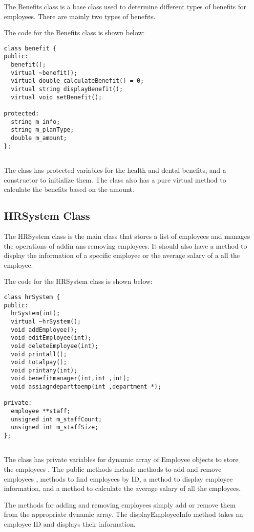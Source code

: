 \documentclass{article}
\begin{document}
The Benefits class is a base class used to determine different types of benefits for employees. There are mainly two types of benefits.

The code for the Benefits class is shown below:

\begin{verbatim}
class benefit {
public:
  benefit();
  virtual ~benefit();
  virtual double calculateBenefit() = 0;
  virtual string displayBenefit();
  virtual void setBenefit();

protected:
  string m_info;
  string m_planType;
  double m_amount;
};


\end{verbatim}

The class has protected variables for the health and dental benefits, and a constructor to initialize them. The class also has a pure virtual method to calculate the benefits based on the amount.

\subsection{HRSystem Class}

The HRSystem class is the main class that stores a list of employees and manages the operations of addin ans removing employees. It should also have a method to display the information of a specific employee or the average salary of a all the employee.

The code for the HRSystem class is shown below:

\begin{verbatim}
class hrSystem {
public:
  hrSystem(int);
  virtual ~hrSystem();
  void addEmployee();
  void editEmployee(int);
  void deleteEmployee(int);
  void printall();
  void totalpay();
  void printany(int);
  void benefitmanager(int,int ,int);
  void assiagndeparttoemp(int ,department *);
  
private:
  employee **staff;
  unsigned int m_staffCount;
  unsigned int m_staffSize;
};


\end{verbatim}

The class has private variables for dynamic array of Employee objects to store the employees . The public methods include methods to add and remove employees , methods to find employees by ID, a method to display employee information, and a method to calculate the average salary of all the employees.

The methods for adding and removing employees simply add or remove them from the appropriate dynamic array. The displayEmployeeInfo method takes an employee ID and displays their information.
\end{document}

